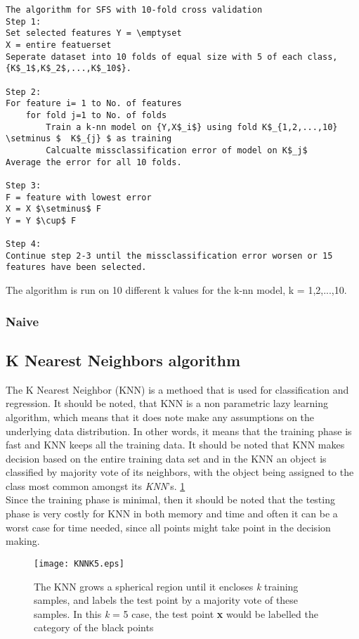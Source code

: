 \begin{lstlisting}[mathescape=true]
The algorithm for SFS with 10-fold cross validation
Step 1:
Set selected features Y = \emptyset
X = entire featuerset
Seperate dataset into 10 folds of equal size with 5 of each class, {K$_1$,K$_2$,...,K$_10$}.

Step 2:
For feature i= 1 to No. of features
	for fold j=1 to No. of folds
		Train a k-nn model on {Y,X$_i$} using fold K$_{1,2,...,10} \setminus $  K$_{j} $ as training
		Calcualte missclassification error of model on K$_j$
Average the error for all 10 folds.

Step 3:
F = feature with lowest error
X = X $\setminus$ F
Y = Y $\cup$ F

Step 4:
Continue step 2-3 until the missclassification error worsen or 15 features have been selected.
\end{lstlisting}
The algorithm is run on 10 different k values for the k-nn model, k = 1,2,...,10.

\subsubsection{Naive}

\subsection{K Nearest Neighbors algorithm}

The K Nearest Neighbor (KNN) is a methoed that is used for classification and regression. It should be noted, that KNN is a non parametric lazy learning algorithm, which means that it does note make any assumptions on the underlying data distribution. In other words, it means that the training phase is fast and KNN keeps all the training data. It should be noted that KNN makes decision based on the entire training data set and in the KNN an object is classified by majority vote of its neighbors, with the object being assigned to the class most common amongst its \textit{KNN}'s. \ref{fig:KNNK5}\\
Since the training phase is minimal, then it should be noted that the testing phase is very costly for KNN in both memory and time and often it can be a worst case for time needed, since all points might take point in the decision making.

\begin{figure}[H]
  \centering
  \texttt{[image: KNNK5.eps]}
  \caption{The KNN grows a spherical region until it encloses \textit{k} training samples, and labels the test point by a majority vote of these samples. In this \textit{k} = 5 case, the test point \textbf{x} would be labelled the category of the black points}\label{fig:KNNK5}
\end{figure}


